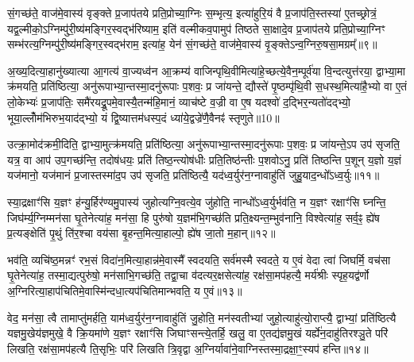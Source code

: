 सं॒गच्छ॑ते॒ वाज॑मे॒वास्य॑ वृङ्क्ते प्र॒जाप॑तये प्रति॒प्रोच्या॒ग्निः स॒म्भृत्य॒ इत्या॑हुरि॒यं वै प्र॒जाप॑ति॒स्तस्या॑ ए॒तच्छ्रोत्रं॒ यद्व॒ल्मीको॒\-ऽग्निम्पु॑री॒ष्य॑मङ्गिर॒स्वद्भ॑रिष्याम॒ इति॑ वल्मीकव॒पामुप॑ तिष्ठते सा॒क्षादे॒व प्र॒जाप॑तये प्रति॒प्रोच्या॒ग्निꣳ सम्भ॑रत्य॒ग्निम्पु॑री॒ष्य॑मङ्गिर॒स्वद्भ॑राम॒ इत्या॑ह॒ येन॑ सं॒गच्छ॑ते॒ वाज॑मे॒वास्य॑ वृ॒ङ्क्ते\-ऽन्व॒ग्निरु॒षसा॒मग्रम्᳚॥९॥

अ॒ख्य॒दित्या॒हानु॑ख्यात्या आ॒गत्य॑ वा॒ज्यध्व॑न आ॒क्रम्य॑ वाजिन्पृथि॒वीमित्या॑हे॒च्छत्ये॒वैन॒म्पूर्व॑या वि॒न्दत्युत्त॑रया॒ द्वाभ्या॒मा क्र॑मयति॒ प्रति॑ष्ठित्या॒ अनु॑रूपाभ्या॒न्तस्मा॒दनु॑रूपाः प॒शवः॒ प्र जा॑यन्ते॒ द्यौस्ते॑ पृ॒ष्ठम्पृ॑थि॒वी स॒धस्थ॒मित्या॑है॒भ्यो वा ए॒तं लो॒केभ्यः॑ प्र॒जाप॑तिः॒ समै॑रयद्रू॒पमे॒वास्यै॒तन्म॑हि॒मानं॒ व्याच॑ष्टे व॒ज्री वा ए॒ष यदश्वो॑ द॒द्भिर॒न्यतो॑दद्भ्यो॒ भूया॒ल्लोँम॑भिरुभ॒याद॑द्भ्यो॒ यं द्वि॒ष्यात्तम॑धस्प॒दं ध्या॑ये॒द्वज्रे॑णै॒वैनꣴ॑ स्तृणुते॥10॥

{\anuvakamend[{आ॒ह॒ पापी॑यान्रु॒द्रादे॒व येनाग्रं॑ व॒ज्री वै स॒प्तद॑श च॥२॥}]}

उत्क्रा॒मोद॑क्रमी॒दिति॒ द्वाभ्या॒मुत्क्र॑मयति॒ प्रति॑ष्ठित्या॒ अनु॑रूपाभ्या॒न्तस्मा॒दनु॑रूपाः प॒शवः॒ प्र जा॑यन्ते॒\-ऽप उप॑ सृजति॒ यत्र॒ वा आप॑ उप॒गच्छ॑न्ति॒ तदोष॑धयः॒ प्रति॑ तिष्ठ॒न्त्योष॑धीः प्रति॒तिष्ठ॑न्तीः प॒शवो\-ऽनु॒ प्रति॑ तिष्ठन्ति प॒शून् य॒ज्ञो य॒ज्ञं यज॑मानो॒ यज॑मानं प्र॒जास्तस्मा॑द॒प उप॑ सृजति॒ प्रति॑ष्ठित्यै॒ यद॑ध्व॒र्युर॑न॒ग्नावाहु॑तिं जुहु॒याद॒न्धो᳚\-ऽध्व॒र्युः॥११॥

स्या॒द्रक्षाꣳ॑सि य॒ज्ञꣳ ह॑न्यु॒र्\mbox{}हिर॑ण्यमु॒पास्य॑ जुहोत्यग्नि॒वत्ये॒व जु॑होति॒ नान्धो᳚\-ऽध्व॒र्युर्भव॑ति॒ न य॒ज्ञꣳ रक्षाꣳ॑सि घ्नन्ति॒ जिघ॑र्म्य॒ग्निम्मन॑सा घृ॒तेनेत्या॑ह॒ मन॑सा॒ हि पुरु॑षो य॒ज्ञम॑भि॒गच्छ॑ति प्रति॒क्ष्यन्त॒म्भुव॑नानि॒ विश्वेत्या॑ह॒ सर्व॒ꣴ॒ ह्ये॑ष प्र॒त्यङ्क्षेति॑ पृ॒थुं ति॑र॒श्चा वय॑सा बृ॒हन्त॒मित्या॒हाल्पो॒ ह्ये॑ष जा॒तो म॒हान्॥१२॥

भव॑ति॒ व्यचि॑ष्ठ॒मन्नꣳ॑ रभ॒सं विदा॑न॒मित्या॒हान्न॑मे॒वास्मै᳚ स्वदयति॒ सर्व॑मस्मै स्वदते॒ य ए॒वं वेदा त्वा॑ जिघर्मि॒ वच॑सा घृ॒तेनेत्या॑ह॒ तस्मा॒द्यत्पुरु॑षो॒ मन॑साभि॒गच्छ॑ति॒ तद्वा॒चा व॑दत्यर॒क्षसेत्या॑ह॒ रक्ष॑सा॒मप॑हत्यै॒ मर्य॑श्रीः स्पृह॒यद्व॑र्णो अ॒ग्निरित्या॒हाप॑चितिमे॒वास्मि॑न्दधा॒त्यप॑चितिमान्भवति॒ य ए॒वं॥१३॥

वेद॒ मन॑सा॒ त्वै तामाप्तु॑मर्\mbox{}हति॒ याम॑ध्व॒र्युर॑न॒ग्नावाहु॑तिं जु॒होति॒ मन॑स्वतीभ्यां जुहो॒त्याहु॑त्यो॒राप्त्यै॒ द्वाभ्यां॒ प्रति॑ष्ठित्यै यज्ञमु॒खेय॑ज्ञमुखे॒ वै क्रि॒यमा॑णे य॒ज्ञꣳ रक्षाꣳ॑सि जिघाꣳसन्त्ये॒तर्\mbox{}हि॒ खलु॒ वा ए॒तद्य॑ज्ञमु॒खं यर्\mbox{}ह्ये॑न॒दाहु॑तिरश्ञु॒ते परि॑ लिखति॒ रक्ष॑सा॒मप॑हत्यै ति॒सृभिः॒ परि॑ लिखति त्रि॒वृद्वा अ॒ग्निर्यावा॑ने॒वाग्निस्तस्मा॒द्रक्षा॒ꣳ॒स्यप॑ हन्ति॥१४॥

